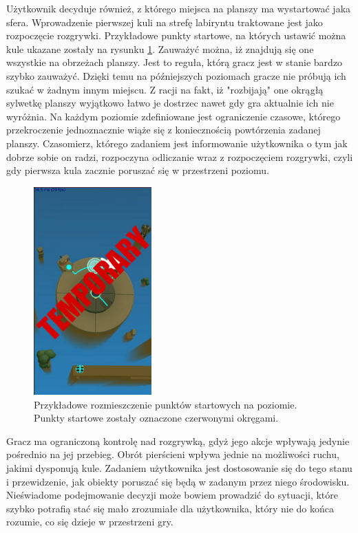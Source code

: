 \documentclass[a4paper,12pt,numbers=noenddot]{report}
\begin{document}
Użytkownik decyduje również, z którego miejsca na planszy ma wystartować jaka sfera. Wprowadzenie pierwszej kuli na strefę labiryntu traktowane jest jako rozpoczęcie rozgrywki. Przykładowe punkty startowe, na których ustawić można kule ukazane zostały na rysunku \ref{fig:sphaze_startpoints_1}. Zauważyć można, iż znajdują się one wszystkie na obrzeżach planszy. Jest to reguła, którą gracz jest w stanie bardzo szybko zauważyć. Dzięki temu na późniejszych poziomach gracze nie próbują ich szukać w żadnym innym miejscu. Z racji na fakt, iż "rozbijają" one okrągłą sylwetkę planszy wyjątkowo łatwo je dostrzec nawet gdy gra aktualnie ich nie wyróżnia. 
Na każdym poziomie zdefiniowane jest ograniczenie czasowe, którego przekroczenie jednoznacznie wiąże się z koniecznością powtórzenia zadanej planszy. Czasomierz, którego zadaniem jest informowanie użytkownika o tym jak dobrze sobie on radzi, rozpoczyna odliczanie wraz z rozpoczęciem rozgrywki, czyli gdy pierwsza kula zacznie poruszać się w przestrzeni poziomu. 

\begin{figure}[h!]
	\centering
  	\includegraphics[height=8cm]{fig/tmp.jpg}
	\caption{Przykładowe rozmieszczenie punktów startowych na poziomie. Punkty startowe zostały oznaczone czerwonymi okręgami.}
	\label{fig:sphaze_startpoints_1}
\end{figure}

Gracz ma ograniczoną kontrolę nad rozgrywką, gdyż jego akcje wpływają jedynie pośrednio na jej przebieg. Obrót pierścieni wpływa jednie na możliwości ruchu, jakimi dysponują kule. Zadaniem użytkownika jest dostosowanie się do tego stanu i przewidzenie, jak obiekty poruszać się będą w zadanym przez niego środowisku. Nieświadome podejmowanie decyzji może bowiem prowadzić do sytuacji, które szybko potrafią stać się mało zrozumiałe dla użytkownika, który nie do końca rozumie, co się dzieje w przestrzeni gry.
\end{document}
